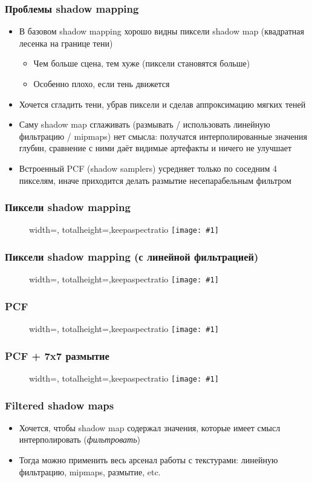 \documentclass[10pt]{beamer}
\newcommand{\slideimage}[1]{
  \begin{figure}
    \begin{adjustbox}{width=\textwidth, totalheight=\textheight-2\baselineskip-2\baselineskip,keepaspectratio}
      \texttt{[image: \#1]}
    \end{adjustbox}
  \end{figure}
}
\begin{document}
\begin{frame}[fragile]
\frametitle{Проблемы shadow mapping}
\begin{itemize}
\item В базовом shadow mapping хорошо видны пиксели shadow map (квадратная лесенка на границе тени)
\pause
\begin{itemize}
\item Чем больше сцена, тем хуже (пиксели становятся больше)
\pause
\item Особенно плохо, если тень движется
\end{itemize}
\pause
\item Хочется сгладить тени, убрав пиксели и сделав аппроксимацию мягких теней
\pause
\item Саму shadow map сглаживать (размывать / использовать линейную фильтрацию / mipmaps) нет смысла: получатся интерполированные значения глубин, сравнение с ними даёт видимые артефакты и ничего не улучшает
\pause
\item Встроенный PCF (shadow samplers) усредняет только по соседним 4 пикселям, иначе приходится делать размытие несепарабельным фильтром
\end{itemize}
\end{frame}

\begin{frame}[fragile]
\frametitle{Пиксели shadow mapping}
\slideimage{shadow_map_nearest.png}
\end{frame}

\begin{frame}[fragile]
\frametitle{Пиксели shadow mapping (с линейной фильтрацией)}
\slideimage{shadow_map_linear.png}
\end{frame}

\begin{frame}[fragile]
\frametitle{PCF}
\slideimage{pcf.png}
\end{frame}

\begin{frame}[fragile]
\frametitle{PCF + 7x7 размытие}
\slideimage{pcf_gauss.png}
\end{frame}

\begin{frame}[fragile]
\frametitle{Filtered shadow maps}
\begin{itemize}
\item Хочется, чтобы shadow map содержал значения, которые имеет смысл интерполировать (\textit{фильтровать})
\pause
\item Тогда можно применить весь арсенал работы с текстурами: линейную фильтрацию, mipmaps, размытие, etc.
\end{itemize}
\end{frame}
\end{document}

